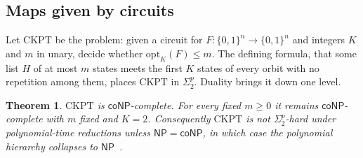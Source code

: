 \documentclass[11pt]{article}
\newtheorem{theorem}{Theorem}[section]
\theoremstyle{definition}
\theoremstyle{remark}
\newcommand{\bits}{\{0,1\}}
\numberwithin{equation}{section}
\begin{document}
\subsection{Maps given by circuits}

Let $\mathrm{CKPT}$ be the problem: given a circuit for
$F:\bits^n\to\bits^n$ and integers $K$ and $m$ in unary, decide whether
$\mathrm{opt}_K(F)\leq m$.  The defining formula, that some list $H$ of at
most $m$ states meets the first $K$ states of every orbit with no
repetition among them, places $\mathrm{CKPT}$ in $\Sigma_2^p$.  Duality
brings it down one level.

\begin{theorem}\label{thm:ckpt-conp}
$\mathrm{CKPT}$ is $\mathsf{coNP}$-complete.  For every fixed $m\geq0$ it
remains $\mathsf{coNP}$-complete with $m$ fixed and $K=2$.  Consequently
$\mathrm{CKPT}$ is not $\Sigma_2^p$-hard under polynomial-time reductions
unless $\mathsf{NP}=\mathsf{coNP}$, in which case the polynomial
hierarchy collapses to $\mathsf{NP}$~\cite{Stockmeyer76}.
\end{theorem}
\end{document}
